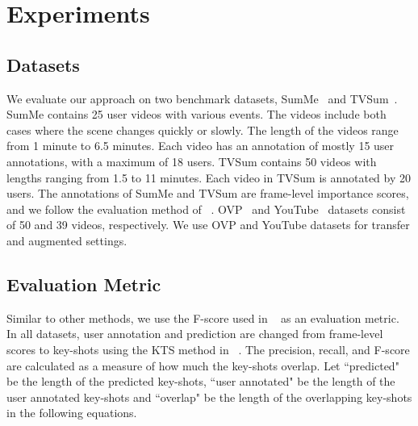 \documentclass[letterpaper]{article} \usepackage{aaai19}  \usepackage{times}  \usepackage{helvet}  \usepackage{courier}  \usepackage{url}  \usepackage{graphicx}  \frenchspacing  \setlength{\pdfpagewidth}{8.5in}  \setlength{\pdfpageheight}{11in}
\begin{document}
\section{Experiments}

\subsection{Datasets}
We evaluate our approach on two benchmark datasets, SumMe~\cite{gygli2014creating} and TVSum~\cite{song2015tvsum}. SumMe contains 25 user videos with various events. The videos include both cases where the scene changes quickly or slowly. The length of the videos range from 1 minute to 6.5 minutes. Each video has an annotation of mostly 15 user annotations, with a maximum of 18 users. TVSum contains 50 videos with lengths ranging from 1.5 to 11 minutes. Each video in TVSum is annotated by 20 users. The annotations of SumMe and TVSum are frame-level importance scores, and we follow the evaluation method of ~\cite{zhang2016video}. OVP~\cite{de2011vsumm} and YouTube~\cite{de2011vsumm} datasets consist of 50 and 39 videos, respectively. We use OVP and YouTube datasets for transfer and augmented settings.


\subsection{Evaluation Metric}
Similar to other methods, we use the F-score used in ~\cite{zhang2016video} as an evaluation metric. In all datasets, user annotation and prediction are changed from frame-level scores to key-shots using the KTS method in ~\cite{zhang2016video}. The precision, recall, and F-score are calculated as a measure of how much the key-shots overlap. Let ``predicted" be the length of the predicted key-shots, ``user annotated" be the length of the user annotated key-shots and ``overlap" be the length of the overlapping key-shots in the following equations.


\begin{table}
\centering
{}
\caption{Evaluation setting for SumMe. In the case of TVSum, we switch between SumMe and TVSum in the above table.}
\label{tab:setting}
\end{table}
\end{document}
